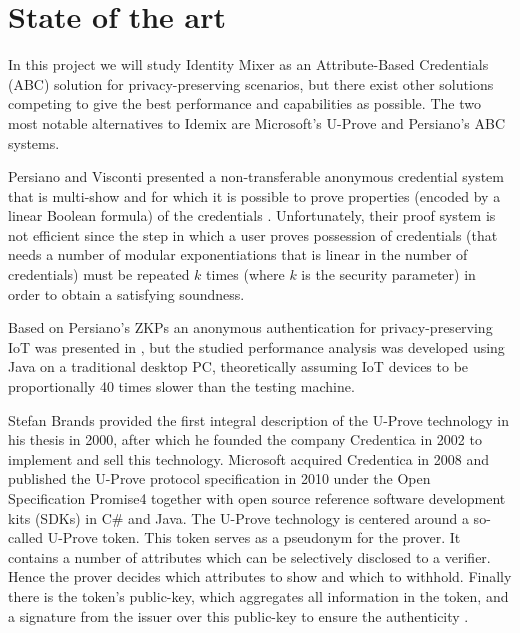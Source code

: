 
\section{State of the art}\label{ch:stateoftheart}

In this project we will study Identity Mixer as an Attribute-Based Credentials (ABC) solution for privacy-preserving scenarios, but there exist other solutions competing to give the best performance and capabilities as possible. The two most notable alternatives to Idemix are Microsoft's U-Prove and Persiano's ABC systems.




Persiano and Visconti presented a non-transferable anonymous
credential system that is multi-show and for which it is possible to prove
properties (encoded by a linear Boolean formula) of the credentials \cite{book:185217}. Unfortunately, their proof system is not efficient since the step in which a user proves
possession of credentials (that needs a number of modular exponentiations that is linear in the number of credentials) must be repeated $k$ times (where $k$ is the
security parameter) in order to obtain a satisfying soundness.


Based on Persiano's ZKPs an anonymous authentication for privacy-preserving IoT was presented in \cite{alcaide2013anonymous}, but the studied performance analysis was developed using Java on a traditional desktop PC, theoretically assuming IoT devices to be proportionally 40 times slower than the testing machine.




Stefan Brands provided the first integral description of the U-Prove
technology in his thesis \cite{uprove} in 2000, after which he founded the company Credentica
in 2002 to implement and sell this technology. Microsoft acquired Credentica
in 2008 and published the U-Prove protocol specification \cite{uprove2} in 2010
under the Open Specification Promise4 together with open source reference software
development kits (SDKs) in C\# and Java.
The U-Prove technology is centered around a so-called U-Prove token. This
token serves as a pseudonym for the prover. It contains a number of attributes
which can be selectively disclosed to a verifier. Hence the prover decides which
attributes to show and which to withhold. Finally there is the token’s public-key, which aggregates all information in the token, and a signature from the issuer
over this public-key to ensure the authenticity \cite{book:947508}.

